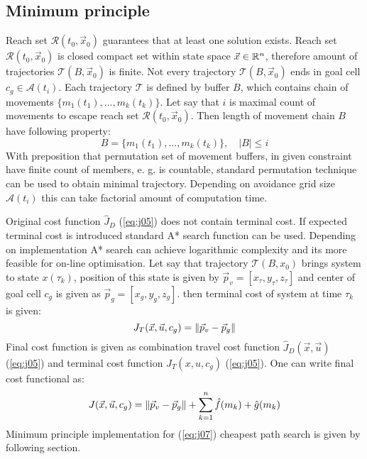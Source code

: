 \subsection{Minimum principle}
\noindent Reach set $\mathscr{R}(t_0,\vec{x}_0)$ guarantees that at least one solution exists. Reach set $\mathscr{R}(t_0,\vec{x}_0)$ is closed compact set within state space $\vec{x}\in\mathbb{R}^n$, therefore amount of trajectories $\mathscr{T}(B,\vec{x}_0)$ is finite. Not every trajectory $\mathscr{T}(B,\vec{x}_0)$ ends in goal cell $c_g\in\mathscr{A}(t_i)$. Each trajectory $\mathscr{T}$ is defined by buffer $B$, which contains chain of movements $\{m_1(t_1),\dots,m_k(t_k)\}$. Let say that $i$ is maximal count of movements to escape reach set $\mathscr{R}(t_0,\vec{x}_0)$. Then length of movement chain $B$ have following property:
\begin{equation}
    B=\{m_1(t_1),\dots,m_k(t_k)\},\quad|B|\le i
\end{equation}
With preposition that permutation set of movement buffers, in given constraint have finite count of members, e. g. is countable, standard permutation technique can be used to obtain  minimal trajectory. Depending on avoidance grid size $\mathscr{A}(t_i)$ this can take factorial amount of computation time.

Original cost function $\hat{J}_D$ (\ref{eq:j05}) does not contain terminal cost. If expected terminal cost is introduced standard A* search function can be used. Depending on implementation A* search can achieve logarithmic complexity and its more feasible for on-line optimisation. Let say that trajectory $\mathscr{T}(B,x_0)$ brings system to state $x(\tau_k)$, position of this state is given by $\vec{p}_v=[x_\tau,y_\tau,z_\tau]$ and center of goal cell $c_g$ is given as $\vec{p}_g=[x_g,y_g,z_g]$. then terminal cost of system at time $\tau_k$ is given:
\begin{equation}\label{eq:j06}
    J_T(\vec{x},\vec{u},c_g) = \left\lVert\vec{p}_v-\vec{p}_g\right\rVert
\end{equation}
Final cost function is given as combination travel cost function $\hat{J}_D(\vec{x},\vec{u})$(\ref{eq:j05}) and terminal cost function $J_T(x,u,c_g)$ (\ref{eq:j05}). One can write final cost functional as:
\begin{equation} \label{eq:j07}
    J(\vec{x},\vec{u},c_g) = \left\lVert\vec{p}_v-\vec{p}_g\right\rVert + \sum_{k=1}^n \hat{f}(m_k) + \hat{g}(m_k)
\end{equation}
Minimum principle implementation for (\ref{eq:j07}) cheapest path search is given by following section.

